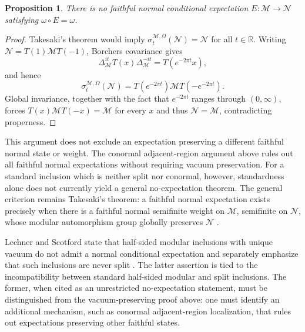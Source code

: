 \documentclass[a4paper,11pt]{article}
\newtheorem{proposition}[theorem]{Proposition}
\theoremstyle{definition}
\begin{document}
\begin{proposition}\label{prop:no-vacuum-expectation}
There is no faithful normal conditional expectation
$E:\mathcal M\to\mathcal N$ satisfying $\omega\circ E=\omega$.
\end{proposition}

\begin{proof}
Takesaki's theorem would imply
$\sigma_t^{\mathcal M,\Omega}(\mathcal N)=\mathcal N$ for all $t\in\mathbb R$.
Writing $\mathcal N=T(1)\mathcal M T(-1)$, Borchers covariance gives
\begin{equation}
 \Delta_{\mathcal M}^{it}T(x)\Delta_{\mathcal M}^{-it}
 =T(e^{-2\pi t}x),
\end{equation}
and hence
\begin{equation}
 \sigma_t^{\mathcal M,\Omega}(\mathcal N)
 =T(e^{-2\pi t})\mathcal M T(-e^{-2\pi t}).
\end{equation}
Global invariance, together with the fact that $e^{-2\pi t}$ ranges through
$(0,\infty)$, forces $T(x)\mathcal M T(-x)=\mathcal M$ for every $x$ and thus
$\mathcal N=\mathcal M$, contradicting properness.
\end{proof}

This argument does not exclude an expectation preserving a different faithful
normal state or weight.  The conormal adjacent-region argument above rules out
all faithful normal expectations without requiring vacuum preservation.  For a
standard inclusion which is neither split nor conormal, however, standardness
alone does not currently yield a general no-expectation theorem.  The general
criterion remains Takesaki's theorem: a faithful normal expectation exists
precisely when there is a faithful normal semifinite weight on $\mathcal M$,
semifinite on $\mathcal N$, whose modular automorphism group globally preserves
$\mathcal N$ \cite{Takesaki1972}.

Lechner and Scotford state that half-sided modular inclusions with unique
vacuum do not admit a normal conditional expectation and separately emphasize
that such inclusions are never split \cite[Section~2]{LechnerScotford2022}.
The latter assertion is tied to the incompatibility between standard
half-sided modular and split inclusions.  The former, when cited as an
unrestricted no-expectation statement, must be distinguished from the
vacuum-preserving proof above: one must identify an additional mechanism, such
as conormal adjacent-region localization, that rules out expectations
preserving other faithful states.


\end{document}
